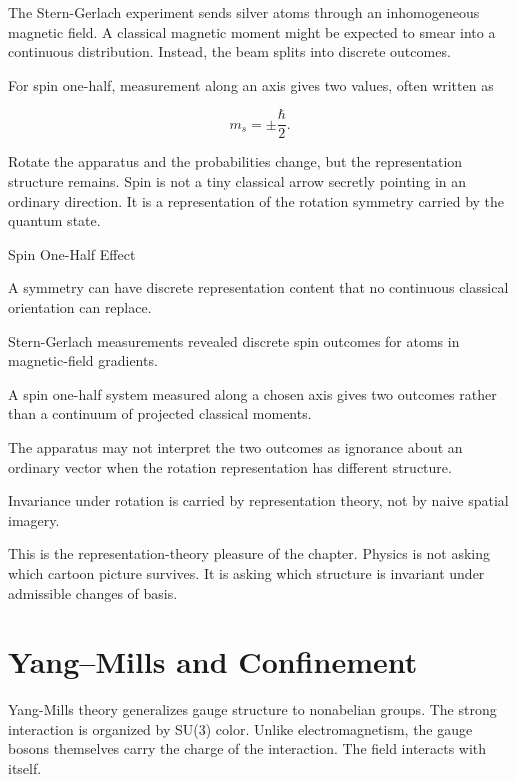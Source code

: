 The Stern-Gerlach experiment sends silver atoms through an inhomogeneous
magnetic field. A classical magnetic moment might be expected to smear into a
continuous distribution. Instead, the beam splits into discrete outcomes.

For spin one-half, measurement along an axis gives two values, often written
as

\[
m_s = \pm \frac{\hbar}{2}.
\label{eq:chapter10-spin-half}
\]

Rotate the apparatus and the probabilities change, but the representation
structure remains. Spin is not a tiny classical arrow secretly pointing in an
ordinary direction. It is a representation of the rotation symmetry carried by
the quantum state.

\begin{phenom}{Spin One-Half Effect}
\label{ph:spin-one-half-effect}

\PhStatement A symmetry can have discrete representation content that no
continuous classical orientation can replace.

\PhOrigin Stern-Gerlach measurements revealed discrete spin outcomes for atoms
in magnetic-field gradients.

\PhObservation A spin one-half system measured along a chosen axis gives two
outcomes rather than a continuum of projected classical moments.

\PhConstraint The apparatus may not interpret the two outcomes as ignorance
about an ordinary vector when the rotation representation has different
structure.

\PhConsequence Invariance under rotation is carried by representation theory,
not by naive spatial imagery.

\end{phenom}

This is the representation-theory pleasure of the chapter. Physics is not
asking which cartoon picture survives. It is asking which structure is
invariant under admissible changes of basis.

\section{Yang--Mills and Confinement}
\label{se:yang-mills-and-confinement}

Yang-Mills theory generalizes gauge structure to nonabelian groups. The strong
interaction is organized by SU(3) color. Unlike electromagnetism, the gauge
bosons themselves carry the charge of the interaction. The field interacts with
itself.

